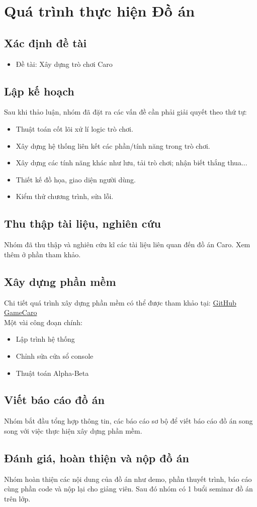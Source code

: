 \section{Quá trình thực hiện Đồ án}
\subsection{Xác định đề tài}
\begin{itemize}
    \item Đề tài: Xây dựng trò chơi Caro
\end{itemize}
\subsection{Lập kế hoạch}
Sau khi thảo luận, nhóm đã đặt ra các vấn đề cần phải giải quyết theo thứ tự:
\begin{itemize}
    \item Thuật toán cốt lõi xử lí logic trò chơi.
    \item Xây dựng hệ thống liên kết các phần/tính năng trong trò chơi.
    \item Xây dựng các tính năng khác như lưu, tải trò chơi; nhận biết thắng thua...
    \item Thiết kế đồ họa, giao diện người dùng.
    \item Kiểm thử chương trình, sửa lỗi.
\end{itemize}
\subsection{Thu thập tài liệu, nghiên cứu}
Nhóm đã thu thập và nghiên cứu kĩ các tài liệu liên quan đến đồ án Caro. Xem thêm ở phần tham khảo.
\subsection{Xây dựng phần mềm}
Chi tiết quá trình xây dựng phần mềm có thể được tham khảo tại: \href{https://github.com/htrung1105/GameCaro}{GitHub GameCaro }\cite{github}\\
Một vài công đoạn chính:
\begin{itemize}
    \item Lập trình hệ thống \cite{laptrinhcaro}
    \item Chỉnh sửa cửa sổ console \cite{windowsh}
    \item Thuật toán Alpha-Beta \cite{alphabeta}
\end{itemize}



\subsection{Viết báo cáo đồ án}
Nhóm bắt đầu tổng hợp thông tin, các báo cáo sơ bộ để viết báo cáo đồ án song song với việc thực hiện xây dựng phần mềm.
\subsection{Đánh giá, hoàn thiện và nộp đồ án}
Nhóm hoàn thiện các nội dung của đồ án như demo, phần thuyết trình, báo cáo cùng phần code và nộp lại cho giảng viên. Sau đó nhóm có 1 buổi seminar đồ án trên lớp.